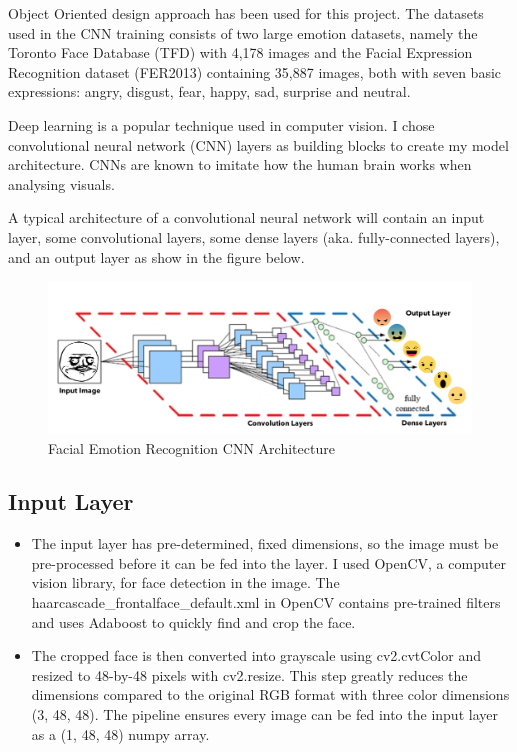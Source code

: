 Object Oriented design approach has been used for this project.
The datasets used in the CNN training consists of two large emotion datasets, namely the Toronto Face Database (TFD) with 4,178 images and the Facial Expression Recognition dataset (FER2013) containing 35,887 images, both with seven basic expressions: angry, disgust, fear, happy, sad, surprise and neutral.

Deep learning is a popular technique used in computer vision. I chose convolutional neural network (CNN) layers as building blocks to create my model architecture. CNNs are known to imitate how the human brain works when analysing visuals.

A typical architecture of a convolutional neural network will contain an input layer, some convolutional layers, some dense layers (aka. fully-connected layers), and an output layer as show in the figure below.

\begin{figure}[h]
	\centering\includegraphics[scale=0.70]{images/problem_formulation.png}
	\caption{Facial Emotion Recognition CNN Architecture}
\end{figure}

\subsection{Input Layer}
\begin{itemize}
	\item The input layer has pre-determined, fixed dimensions, so the image must be pre-processed before it can be fed into the layer. I used OpenCV, a computer vision library, for face detection in the image. The haarcascade\_frontalface\_default.xml in OpenCV contains pre-trained filters and uses Adaboost to quickly find and crop the face.
	\item The cropped face is then converted into grayscale using cv2.cvtColor and resized to 48-by-48 pixels with cv2.resize. This step greatly reduces the dimensions compared to the original RGB format with three color dimensions (3, 48, 48). The pipeline ensures every image can be fed into the input layer as a (1, 48, 48) numpy array.
\end{itemize}

